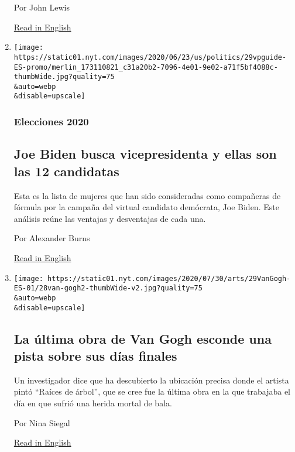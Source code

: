 \begin{enumerate}
  Por John Lewis

  \href{https://www.nytimes.com/2020/07/30/opinion/john-lewis-civil-rights-america.html}{Read
  in English}
\item
  \href{/es/2020/07/29/espanol/estados-unidos/biden-vicepresidente.html}{}

  \texttt{[image: https://static01.nyt.com/images/2020/06/23/us/politics/29vpguide-ES-promo/merlin\_173110821\_c31a20b2-7096-4e01-9e02-a71f5bf4088c-thumbWide.jpg?quality=75\\\&auto=webp\\\&disable=upscale]}

  \hypertarget{elecciones-2020-1}{%
  \subsubsection{Elecciones 2020}\label{elecciones-2020-1}}

  \hypertarget{joe-biden-busca-vicepresidenta-y-ellas-son-las-12-candidatas}{%
  \subsection{Joe Biden busca vicepresidenta y ellas son las 12
  candidatas}\label{joe-biden-busca-vicepresidenta-y-ellas-son-las-12-candidatas}}

  Esta es la lista de mujeres que han sido consideradas como compañeras
  de fórmula por la campaña del virtual candidato demócrata, Joe Biden.
  Este análisis reúne las ventajas y desventajas de cada una.

  Por Alexander Burns

  \href{https://www.nytimes.com/article/biden-vice-president-2020.html}{Read
  in English}
\item
  \href{/es/2020/07/29/espanol/cultura/vincent-van-gogh-raices-arbol.html}{}

  \texttt{[image: https://static01.nyt.com/images/2020/07/30/arts/29VanGogh-ES-01/28van-gogh2-thumbWide-v2.jpg?quality=75\\\&auto=webp\\\&disable=upscale]}

  \hypertarget{la-uxfaltima-obra-de-van-gogh-esconde-una-pista-sobre-sus-duxedas-finales}{%
  \subsection{La última obra de Van Gogh esconde una pista sobre sus
  días
  finales}\label{la-uxfaltima-obra-de-van-gogh-esconde-una-pista-sobre-sus-duxedas-finales}}

  Un investigador dice que ha descubierto la ubicación precisa donde el
  artista pintó ``Raíces de árbol'', que se cree fue la última obra en
  la que trabajaba el día en que sufrió una herida mortal de bala.

  Por Nina Siegal

  \href{https://www.nytimes.com/2020/07/28/arts/design/vincent-van-gogh-tree-roots.html}{Read
  in English}
\end{enumerate}

